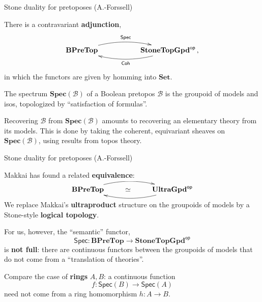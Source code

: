 \documentclass{beamer}
\newcommand{\myemph}[1]{\textbf{#1}}    %
\begin{document}
\begin{frame}{Stone duality for pretoposes (A.-Forssell)}


\begin{theorem}[A.-Forssell 2008]
There is a contravariant \myemph{adjunction},
\[
\xymatrix{ 
\mathbf{BPreTop}  \ar@/{}^{1pc}/[rr]^{\mathsf{Spec}}     &&  \mathbf{StoneTopGpd}^{\mathsf{op}}  \ar@/{}^{1pc}/[ll]^{\mathsf{Coh}} \,,
} 
\]
in which the functors are given by homming into $\mathbf{Set}$.
\end{theorem}

The spectrum $\mathbf{Spec}(\mathcal{B})$ of a Boolean pretopos $\mathcal{B}$ is the groupoid of models and isos, topologized by ``satisfaction of formulas''.
\medskip

Recovering $\mathcal{B}$ from $\mathbf{Spec}(\mathcal{B})$ amounts to recovering an elementary theory from its models.  This is done by taking the coherent, equivariant sheaves on $\mathbf{Spec}(\mathcal{B})$, using results from topos theory.

\end{frame}
\begin{frame}{Stone duality for pretoposes (A.-Forssell)}

Makkai has found a related \myemph{equivalence}:
\[
\xymatrix{ 
\mathbf{BPreTop}  \ar@/{}^{1pc}/[rr]     & \simeq &  \mathbf{UltraGpd}^{\mathsf{op}}  \ar@/{}^{1pc}/[ll] \\
} 
\]
We replace Makkai's \myemph{ultraproduct} structure on the groupoids of models by a Stone-style \myemph{logical topology}.
\medskip

For us, however, the ``semantic'' functor,
\[
\mathsf{Spec} : \mathbf{BPreTop} \longrightarrow \mathbf{StoneTopGpd}^{\mathsf{op}}
\]
 is \myemph{not full}: there are continuous functors between the groupoids of models that do not come from a ``translation of theories''.
\medskip

Compare the case of \myemph{rings} $A, B$:  a continuous function $$f : \mathsf{Spec}(B) \to \mathsf{Spec}(A)$$ need not come from a ring homomorphism $h : A\to B$. 

\end{frame}
\end{document}
